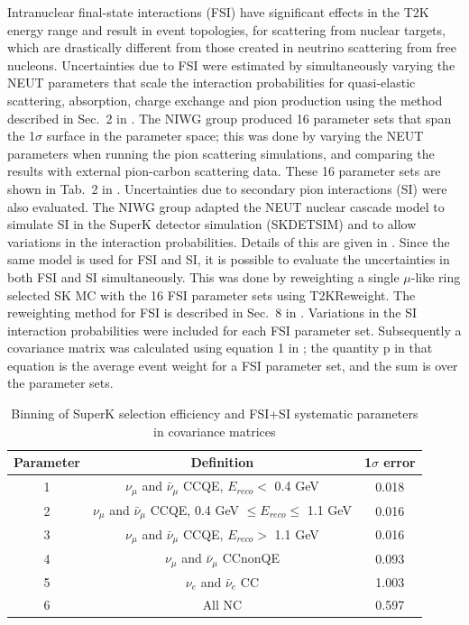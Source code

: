 \begin{enumerate}
Intranuclear final-state interactions (FSI) have significant effects in the T2K energy range and
result in event topologies, for scattering from nuclear targets, which are drastically different from
those created in neutrino scattering from free nucleons.
Uncertainties due to FSI were estimated by simultaneously varying the NEUT parameters that scale the interaction probabilities for quasi-elastic
scattering, absorption, charge exchange and pion production using the method described in Sec.\ 2 in \cite{NIWGErr}. The NIWG group produced 16
parameter sets that span the 1$\sigma$ surface in the parameter space; this was done by varying the NEUT parameters when running the pion scattering
simulations, and comparing the results with external pion-carbon scattering data. These 16 parameter sets are shown in Tab.\ 2 in \cite{NIWGErr}.
Uncertainties due to secondary pion interactions (SI) were also evaluated. The NIWG group adapted the NEUT nuclear cascade model to simulate SI in the
SuperK detector simulation (SKDETSIM) and to allow variations in the interaction probabilities. Details of this are given in \cite{SI}.
Since the same model is used for FSI and SI, it is possible to evaluate the uncertainties in both FSI and SI simultaneously. This was done by
reweighting a single $\mu$-like ring selected SK MC with the 16 FSI parameter sets using T2KReweight. The reweighting method for FSI is described
in Sec.\ 8 in \cite{NEUTnuclear}. Variations in the SI interaction probabilities were included for each FSI parameter set.  Subsequently a covariance
matrix was calculated using equation 1 in \cite{NIWGErr}; the quantity p in that equation is the average event weight for a FSI parameter set, and
the sum is over the parameter sets.

{
\renewcommand{\arraystretch}{1.5}
\begin{table}
\centering
\begin{tabular}{| c | c | c |}
\hline
 Parameter               &  Definition  &  1$\sigma$ error   \\
\hline
   1       &  $\nu_\mu$ and $\bar{\nu}_{\mu}$ CCQE, $E_{reco}<$ 0.4 GeV                    & 0.018      \\
   2       &  $\nu_\mu$ and $\bar{\nu}_{\mu}$ CCQE, 0.4 GeV $\leq E_{reco} \leq$ 1.1 GeV   & 0.016      \\
   3       &  $\nu_\mu$ and $\bar{\nu}_{\mu}$ CCQE, $E_{reco}>$ 1.1 GeV                    & 0.016      \\
   4       &  $\nu_\mu$ and $\bar{\nu}_{\mu}$ CCnonQE                                      & 0.093      \\
   5       &  $\nu_e$   and $\bar{\nu}_{e}$ CC                                             & 1.003      \\
   6       &  All NC                                                                       & 0.597      \\
\hline
\end{tabular}
\caption{
  Binning of SuperK selection efficiency and FSI+SI systematic parameters in covariance matrices
}
\label{tab:fsi_si_params}
\end{table}
}


\end{enumerate}
